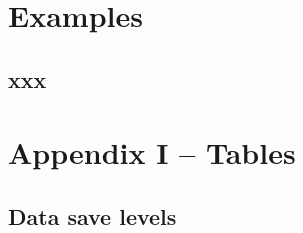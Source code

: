 \documentclass[11pt,fleqn]{book} %
\begin{document}
\cleardoublepage


\chapter{Examples}

\hfill \break


\newpage


\section{xxx}



%

\cleardoublepage


\chapter{Appendix I -- Tables}

\hfill \break


\newpage


\section{Data save levels}
\end{document}
